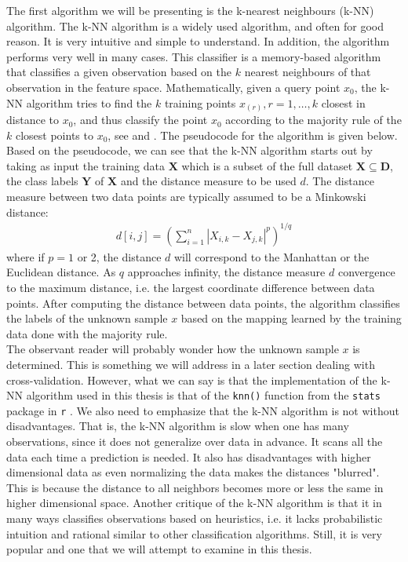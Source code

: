 \documentclass[../thesis.tex]{subfiles}
\begin{document}
\noindent The first algorithm we will be presenting is the k-nearest neighbours (k-NN) algorithm. The k-NN algorithm \citep{fix1951discriminatory} is a widely used algorithm, and often for good reason. It is very intuitive and simple to understand. In addition, the algorithm performs very well in many cases. This classifier is a memory-based algorithm that classifies a given observation based on the $k$ nearest neighbours of that observation in the feature space. Mathematically, given a query point $x_0$, the k-NN algorithm tries to find the $k$ training points $x_{(r)}, r = 1, \hdots, k$ closest in distance to $x_0$, and thus classify the point $x_0$ according to the majority rule of the $k$ closest points to $x_0$, see \citep{friedman2009elements} and \citep{james2013introduction}. The pseudocode for the algorithm is given below. Based on the pseudocode, we can see that the k-NN algorithm starts out by taking as input the training data $\mathbf{X}$ which is a subset of the full dataset ${\displaystyle \mathbf{X}\subseteq \mathbf{D}}$, the class labels $\mathbf{Y}$ of $\mathbf{X}$ and the distance measure to be used $d$. The distance measure between two data points are typically assumed to be a Minkowski distance:
\begin{align}
    d[i,j] = \left(\sum_{i=1}^n |X_{i, k} - X_{j, k}|^p\right)^{1/q}
\end{align}
where if $p=1$ or 2, the distance $d$ will correspond to the Manhattan or the Euclidean distance. As $q$ approaches infinity, the distance measure $d$ convergence to the maximum distance, i.e. the largest coordinate difference between data points. After computing the distance between data points, the algorithm classifies the labels of the unknown sample $x$ based on the mapping learned by the training data done with the majority rule.\\
\indent The observant reader will probably wonder how the unknown sample $x$ is determined. This is something we will address in a later section dealing with cross-validation. However, what we can say is that the implementation of the k-NN algorithm used in this thesis is that of the \texttt{knn()} function from the \texttt{stats} package in \texttt{r} \citep{stats}. We also need to emphasize that the k-NN algorithm is not without disadvantages. That is, the k-NN algorithm is slow when one has many observations, since it does not generalize over data in advance. It scans all the data each time a prediction is needed. It also has disadvantages with higher dimensional data as even normalizing the data makes the distances "blurred". This is because the distance to all neighbors becomes more or less the same in higher dimensional space. Another critique of the k-NN algorithm is that it in many ways classifies observations based on heuristics, i.e. it lacks probabilistic intuition and rational similar to other classification algorithms. Still, it is very popular and one that we will attempt to examine in this thesis.\\
\end{document}
